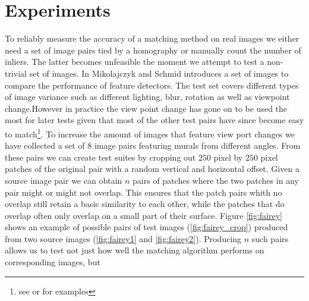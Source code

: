\documentclass[12pt,journal,compsoc]{IEEEtran}
\begin{document}
\section{Experiments}
\label{experiment}
%
To reliably measure the accuracy of a matching method on real images we 
either need a set of image pairs tied by a homography or manually count 
the number of inliers. The latter becomes unfeasible the moment we 
attempt to test a non-trivial set of images. In 
\cite{mikolajczyk2005performance} Mikolajczyk and Schmid introduces a 
set of images to compare the performance of feature detectors. The test 
set covers different types of image variance such as different lighting, 
blur, rotation as well as viewpoint change.However in practice the view 
point change has gone on to be used the most for later tests given that 
most of the other test pairs have since become easy to 
match\footnote{see \cite{wu2011robust} or \cite{delponte2006svd} for 
examples}.
%
%
To increase the amount of images that feature view port changes we have 
collected a set of $8$ image pairs featuring murals from different 
angles. From these pairs we can create test suites by cropping out $250$ 
pixel by $250$ pixel patches of the original pair with a random vertical 
and horizontal offset. Given a source image pair we can obtain $n$ pairs 
of patches where the two patches in any pair might or might not overlap.  
This ensures that the patch pairs whith no overlap still retain a basic 
similarity to each other, while the patches that do overlap often only 
overlap on a small part of their surface. Figure \ref{fig:fairey} shows 
an example of possible pairs of test images (\ref{fig:fairey_crop}) 
produced from two source images (\ref{fig:fairey1} and 
\ref{fig:fairey2}). Producing $n$ such pairs allows us to test not just 
how well the matching algorithm performs on corresponding images, but 
\end{document}
